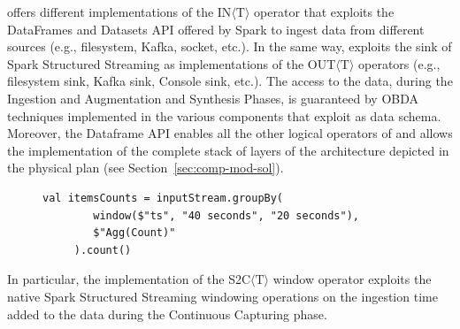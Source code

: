 \sparkdi{} offers different implementations of the IN$\langle\mathrm{T}\rangle$ operator that exploits the DataFrames and Datasets API offered by Spark to ingest data from different sources (e.g., filesystem, Kafka, socket, etc.).
In the same way, \sparkdi{} exploits the sink of Spark Structured Streaming as implementations of the OUT$\langle\mathrm{T}\rangle$ operators (e.g., filesystem sink, Kafka sink, Console sink, etc.).
The access to the data, during the Ingestion and Augmentation and Synthesis Phases,  is guaranteed by OBDA techniques implemented in the various components that exploit \frappe{} as data schema.
Moreover, the Dataframe API enables all the other logical operators of \river{} and allows the implementation of the complete stack of layers of the architecture depicted in the \river{} physical plan (see Section~\ref{sec:comp-mod-sol}).

\begin{figure}[ht]
\begin{minipage}{0.95\linewidth}
\begin{lstlisting}[caption={Example of Window operator in Spark},label=lst:spark-ex,style=SPARKCODE]
   val itemsCounts = inputStream.groupBy(
        window($"ts", "40 seconds", "20 seconds"),
        $"Agg(Count)"
     ).count()
\end{lstlisting}
\end{minipage}
\end{figure}

In particular, the \sparkdi{} implementation of the S2C$\langle\mathrm{T}\rangle$ window operator exploits the native Spark Structured Streaming windowing operations on the ingestion time added to the data during the Continuous Capturing phase.

